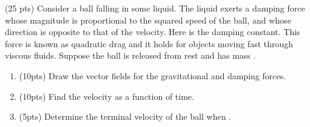 \documentclass{article}
\begin{document}
\begin{problem}
    (25 pts) Consider a ball falling in some liquid. The liquid exerts a damping force   
whose magnitude is proportional to the squared speed  of the ball, and whose direction is 
opposite to that of the velocity. Here  is the damping constant. This force is known as quadratic drag and it holds for objects moving fast through viscous fluids. Suppose the ball is released from rest and has mass . 
\begin{enumerate}[label=(\alph*)]
    \item (10pts) Draw the vector fields for the gravitational and damping forces.
    \item (10pts) Find the velocity as a function of time.
    \item (5pts) Determine the terminal velocity of the ball when .
\end{enumerate}
\end{problem}
\end{document}
